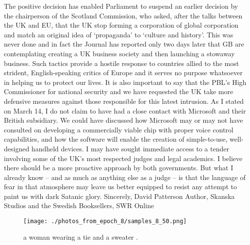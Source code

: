 \documentclass{article}%
\begin{document}
The positive decision has enabled Parliament to suspend an earlier decision by the chairperson of the Scotland Commission, who asked, after the talks between the UK and EU, that the UK stop forming a corporation of global corporation and match an original idea of ‘propaganda’ to ‘culture and history’. This was never done and in fact the Journal has reported only two days later that GB are contemplating creating a UK business society and then launching a stowaway business.\newline%
Such tactics provide a hostile response to countries allied to the most strident, English{-}speaking critics of Europe and it serves no purpose whatsoever in helping us to protect our lives.\newline%
It is also important to say that the PBL’s High Commissioner for national security and we have requested the UK take more defensive measures against those responsible for this latest intrusion.\newline%
As I stated on March 14, I do not claim to have had a close contact with Microsoft and their British subsidiary. We could have discussed how Microsoft may or may not have consulted on developing a commercially viable chip with proper voice control capabilities, and how the software will enable the creation of simple{-}to{-}use, well{-}designed handheld devices. I may have sought immediate access to a tender involving some of the UK’s most respected judges and legal academics.\newline%
I believe there should be a more proactive approach by both governments. But what I already know – and as much as anything else as a judge – is that the language of fear in that atmosphere may leave us better equipped to resist any attempt to paint us with dark Satanic glory.\newline%
Sincerely,\newline%
David Patterson\newline%
Author, Skanska Studios and the Swedish Booksellers, SWR Online\newline%

%


\begin{figure}[h!]%
\centering%
\texttt{[image: ./photos\_from\_epoch\_8/samples\_8\_50.png]}%
\caption{a woman wearing a tie and a sweater .}%
\end{figure}

%
\end{document}

